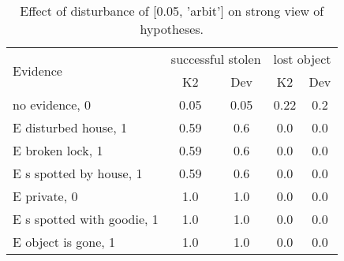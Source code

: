 \begin{table}\begin{tabular}{l|cc|cc}\toprule\multirow{2}{*}{Evidence} & \multicolumn{2}{c}{successful stolen}& \multicolumn{2}{c}{lost object}\\& {K2} & {Dev}& {K2} & {Dev}\\\midrule
no evidence, 0 & 0.05&0.05&0.22&0.2\\E disturbed house, 1 & 0.59&0.6&0.0&0.0\\E broken lock, 1 & 0.59&0.6&0.0&0.0\\E s spotted by house, 1 & 0.59&0.6&0.0&0.0\\E private, 0 & 1.0&1.0&0.0&0.0\\E s spotted with goodie, 1 & 1.0&1.0&0.0&0.0\\E object is gone, 1 & 1.0&1.0&0.0&0.0\\\bottomrule\end{tabular}\caption{Effect of disturbance of [0.05, 'arbit'] on strong view of hypotheses.}\end{table}
